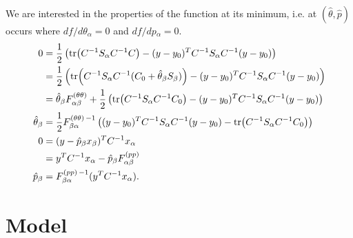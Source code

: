\documentclass{article}
\begin{document}
We are interested in the properties of the function at its minimum, i.e. at $(\hat{\theta},\hat{p})$ occurs where $df/d\theta_\alpha=0 $ and $df/dp{_\alpha}=0$.
\begin{align}
0 & = \frac{1}{2}\left(\tr(C^{-1}S_\alpha C^{-1} C)  - (y-y_0)^T  C^{-1} S_{\alpha} C^{-1}  (y-y_0)\right) \\
& = \frac{1}{2}\left(\tr(C^{-1}S_\alpha C^{-1} (C_0 + \hat{\theta}_\beta S_\beta) )  - (y-y_0)^T  C^{-1} S_{\alpha} C^{-1}  (y-y_0)\right) \\
& =\hat{ \theta}_\beta F^{(\theta \theta)}_{\alpha \beta} +  \frac{1}{2}\left(\tr(C^{-1}S_\alpha C^{-1} C_0)  - (y-y_0)^T  C^{-1} S_{\alpha} C^{-1}  (y-y_0)\right) \\
\hat{ \theta}_\beta  & =  \frac{1}{2} F^{(\theta \theta)\, -1}_{\beta \alpha} \left( (y-y_0)^T  C^{-1} S_{\alpha} C^{-1}  (y-y_0) - \tr(C^{-1}S_\alpha C^{-1} C_0) \right) \\
0 &=  (y-\hat{p}_\beta x_\beta )^T C^{-1} x_\alpha \\
& = y^TC^{-1} x_\alpha - \hat{p}_\beta F^{(pp)}_{\alpha \beta} \\
 \hat{p}_\beta  & =   F^{(pp)\,-1}_{\beta \alpha} (y^TC^{-1} x_\alpha ).
\end{align}
\newpage
\section{Model}
\end{document}

